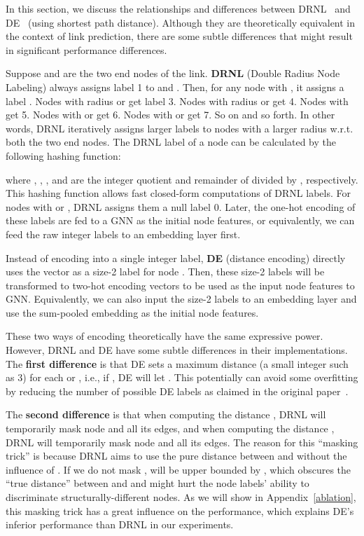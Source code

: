 \documentclass{article}
\begin{document}
In this section, we discuss the relationships and differences between DRNL~\citep{zhang2018link} and DE~\citep{li2020distance} (using shortest path distance). Although they are theoretically equivalent in the context of link prediction, there are some subtle differences that might result in significant performance differences.

Suppose  and  are the two end nodes of the link. \textbf{DRNL} (Double Radius Node Labeling) always assigns label 1 to  and . Then, for any node  with , it assigns a label . Nodes with radius  or  get label 3. Nodes with radius  or  get 4. Nodes with  get 5. Nodes with  or  get 6. Nodes with  or  get 7. So on and so forth. In other words, DRNL iteratively assigns larger labels to nodes with a larger radius w.r.t. both the two end nodes. The DRNL label  of a node  can be calculated by the following hashing function:

where , , ,  and  are the integer quotient and remainder of  divided by , respectively. This hashing function allows fast closed-form computations of DRNL labels. For nodes with  or , DRNL assigns them a null label 0. Later, the one-hot encoding of these labels are fed to a GNN as the initial node features, or equivalently, we can feed the raw integer labels to an embedding layer first.

Instead of encoding  into a single integer label, \textbf{DE} (distance encoding) directly uses the vector  as a size-2 label for node . Then, these size-2 labels will be transformed to two-hot encoding vectors to be used as the input node features to GNN. Equivalently, we can also input the size-2 labels to an embedding layer and use the sum-pooled embedding as the initial node features.

These two ways of encoding  theoretically have the same expressive power. However, DRNL and DE have some subtle differences in their implementations. The \textbf{first difference} is that DE sets a maximum distance  (a small integer such as 3) for each  or , i.e., if , DE will let . This potentially can avoid some overfitting by reducing the number of possible DE labels as claimed in the original paper~\citep{li2020distance}.

The \textbf{second difference} is that when computing the distance , DRNL will temporarily mask node  and all its edges, and when computing the distance , DRNL will temporarily mask node  and all its edges.
The reason for this ``masking trick'' is because DRNL aims to use the pure distance between  and  without the influence of . If we do not mask ,  will be upper bounded by , which obscures the ``true distance'' between  and  and might hurt the node labels' ability to discriminate structurally-different nodes. As we will show in Appendix~\ref{ablation}, this masking trick has a great influence on the performance, which explains DE's inferior performance than DRNL in our experiments.
\end{document}
